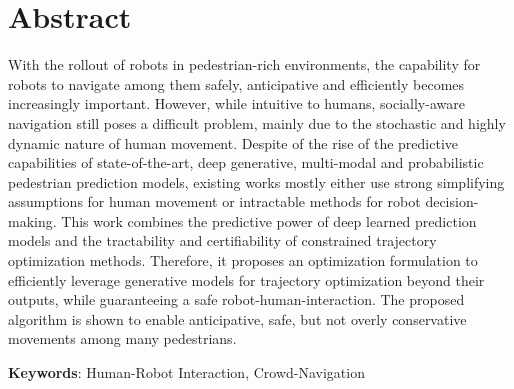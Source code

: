 \chapter*{Abstract}
With the rollout of robots in pedestrian-rich environments, the capability for robots to navigate among them safely, anticipative and efficiently becomes increasingly important. However, while intuitive to humans, socially-aware navigation still poses a difficult problem, mainly due to the stochastic and highly dynamic nature of human movement. Despite of the rise of the predictive capabilities of state-of-the-art, deep generative, multi-modal and probabilistic pedestrian prediction models, existing works mostly either use strong simplifying assumptions for human movement or intractable methods for robot decision-making. This work combines the predictive power of deep learned prediction models and the tractability and certifiability of constrained trajectory optimization methods. Therefore, it proposes an optimization formulation to efficiently leverage generative models for trajectory optimization beyond their outputs, while guaranteeing a safe robot-human-interaction. The proposed algorithm is shown to enable anticipative, safe, but not overly conservative movements among many pedestrians.

\vspace{1cm}
\textbf{Keywords}: Human-Robot Interaction, Crowd-Navigation 
